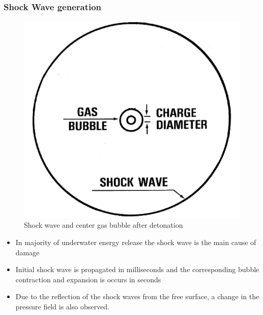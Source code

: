\documentclass{beamer}
\begin{document}
\begin{frame}
\frametitle{Shock Wave generation}
\begin{figure}[h]  
\begin{center}  
\includegraphics[scale=0.15]{2.png}
\caption{\tiny{Shock wave and center gas bubble after detonation}}
\end{center}  
\end{figure}
\begin{itemize}
  \item \small In majority of underwater energy release the shock wave is the main cause of damage 
  \item \small Initial shock wave is propagated in milliseconds and the corresponding bubble contraction and expansion is occurs in seconds 
  \item \small Due to the reflection of the shock waves from the free surface, a change in the pressure field is also observed.
\end{itemize}
\end{frame}

\end{document}
